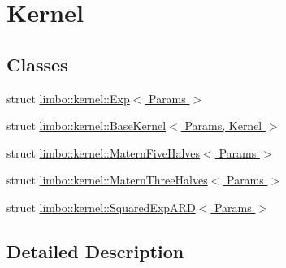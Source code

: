 \hypertarget{group__kernel}{}\section{Kernel}
\label{group__kernel}
\subsection*{Classes}
\begin{DoxyCompactItemize}
\item 
struct \hyperlink{structlimbo_1_1kernel_1_1_exp}{limbo\+::kernel\+::\+Exp$<$ Params $>$}
\item 
struct \hyperlink{structlimbo_1_1kernel_1_1_base_kernel}{limbo\+::kernel\+::\+Base\+Kernel$<$ Params, Kernel $>$}
\item 
struct \hyperlink{structlimbo_1_1kernel_1_1_matern_five_halves}{limbo\+::kernel\+::\+Matern\+Five\+Halves$<$ Params $>$}
\item 
struct \hyperlink{structlimbo_1_1kernel_1_1_matern_three_halves}{limbo\+::kernel\+::\+Matern\+Three\+Halves$<$ Params $>$}
\item 
struct \hyperlink{structlimbo_1_1kernel_1_1_squared_exp_a_r_d}{limbo\+::kernel\+::\+Squared\+Exp\+A\+R\+D$<$ Params $>$}
\end{DoxyCompactItemize}


\subsection{Detailed Description}
